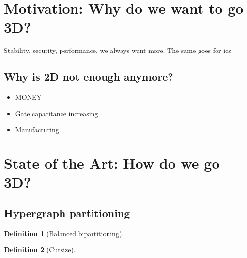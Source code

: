 \documentclass[11pt,a4paper]{article}
\theoremstyle{customdef}
\newtheorem{definition}{Definition}
\begin{document}

\section{Motivation: Why do we want to go 3D?}

Stability, security, performance, we always want more.
The same goes for \glspl{ic}.


\subsection{Why is 2D not enough anymore?}
\begin{itemize}
	\item MONEY
	\item Gate capacitance increasing
	\item Manufacturing. 
\end{itemize}







\section{State of the Art: How do we go 3D?}
\subsection{Hypergraph partitioning}
\begin{definition}[Balanced bipartitioning]\label{def:bal-bipart}

\end{definition}

\begin{definition}[Cutsize]\label{def:cutsize}
\end{definition}
\end{document}
